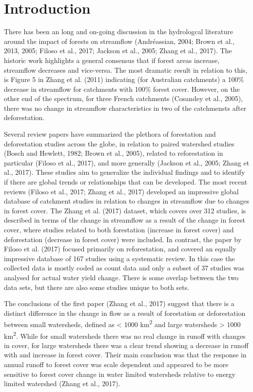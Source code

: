 \documentclass[]{elsarticle} %
\begin{document}
\hypertarget{introduction}{%
\section{Introduction}\label{introduction}}

There has been an long and on-going discussion in the hydrologcal literature around the impact of forests on streamflow (Andréassian, 2004; Brown et al., 2013, 2005; Filoso et al., 2017; Jackson et al., 2005; Zhang et al., 2017). The historic work highlights a general consensus that if forest areas increase, streamflow decreases and vice-versa. The most dramatic result in relation to this, is Figure 5 in Zhang et al. (2011) indicating (for Australian catchments) a 100\% decrease in streamflow for catchments with 100\% forest cover. However, on the other end of the spectrum, for three French catchments (Cosandey et al., 2005), there was no change in streamflow characteristics in two of the catchmensts after deforestation.

Several review papers have summarized the plethora of forestation and deforestation studies across the globe, in relation to paired watershed studies (Bosch and Hewlett, 1982; Brown et al., 2005), related to reforestation in particular (Filoso et al., 2017), and more generally (Jackson et al., 2005; Zhang et al., 2017). These studies aim to generalize the individual findings and to identify if there are global trends or relationships that can be developed. The most recent reviews (Filoso et al., 2017; Zhang et al., 2017) developed an impressive global database of catchment studies in relation to changes in streamflow due to changes in forest cover. The Zhang et al. (2017) dataset, which covers over 312 studies, is described in terms of the change in streamflow as a result of the change in forest cover, where studies related to both forestation (increase in forest cover) and deforestation (decrease in forest cover) were included. In contrast, the paper by Filoso et al. (2017) focused primarily on reforestation, and covered an equally impressive database of 167 studies using a systematic review. In this case the collected data is mostly coded as count data and only a subset of 37 studies was analysed for actual water yield change. There is some overlap between the two data sets, but there are also some studies unique to both sets.

The conclusions of the first paper (Zhang et al., 2017) suggest that there is a distinct difference in the change in flow as a result of forestation or deforestation between small watersheds, defined as \textless{} 1000 km\textsuperscript{2} and large watersheds \textgreater{} 1000 km\textsuperscript{2}. While for small watersheds there was no real change in runoff with changes in cover, for large watersheds there was a clear trend showing a decrease in runoff with and increase in forest cover. Their main conclusion was that the response in annual runoff to forest cover was scale dependent and appeared to be more sensitive to forest cover change in water limited watersheds relative to energy limited watershed (Zhang et al., 2017).
\end{document}
